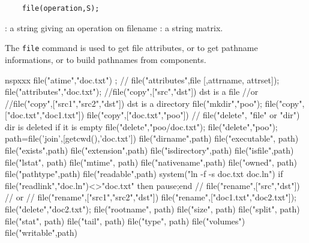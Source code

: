 \begin{mandesc}
\end{mandesc}

\begin{calling_sequence}
  \begin{verbatim}
    file(operation,S);
  \end{verbatim}
\end{calling_sequence}
\begin{parameters}
  \begin{varlist}
    : a string giving an operation on filename
    : a string matrix.
  \end{varlist}
\end{parameters}
\begin{mandescription}
  The \verb!file! command is used to get file attributes, or 
  to get pathname informations, or to build pathnames from 
  components.
\end{mandescription}
\begin{examples}
  \begin{mintednsp}{nspxxx}
    file("atime","doc.txt") ;
    // file("attributes",file [,attrname, attrset]);
    file("attributes","doc.txt");
    //file("copy",["src","dst"])	    dst is a file 
    //or 
    //file("copy",["src1","src2","dst"])  dst is a directory 
    file("mkdir","poo");
    file("copy",["doc.txt","doc1.txt"]) 
    file("copy",["doc.txt","poo"]) 
    // file("delete", "file" or "dir")     dir is deleted if it is empty 
    file("delete","poo/doc.txt");
    file("delete","poo");
    path=file('join',[getcwd(),'doc.txt'])
    file("dirname",path)
    file("executable", path)
    file("exists",path)
    file("extension",path)
    file("isdirectory",path)
    file("isfile",path) 
    file("lstat", path) 
    file("mtime", path) 
    file("nativename",path)
    file("owned", path)
    file("pathtype",path) 
    file("readable",path) 
    system("ln -f -s doc.txt doc.ln")
    if file("readlink","doc.ln")<>"doc.txt" then pause;end
    // file("rename",["src","dst"])
    // or 
    // file("rename",["src1","src2","dst"])
    file("rename",["doc1.txt","doc2.txt"]);
    file("delete","doc2.txt");
    file("rootname", path)
    file("size", path)
    file("split", path)
    file("stat", path)
    file("tail", path)
    file("type", path)
    file("volumes")
    file("writable",path)
  \end{mintednsp}
\end{examples}
\begin{manseealso}
\end{manseealso}

